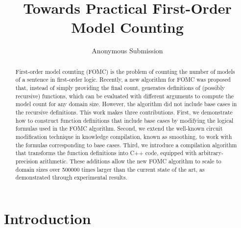 \documentclass[letterpaper]{article} %
\title{Towards Practical First-Order Model Counting}
\author{Anonymous Submission}
\theoremstyle{remark}
\theoremstyle{definition}
\begin{document}
\maketitle

\begin{abstract}
  First-order model counting (FOMC) is the problem of counting the number of
  models of a sentence in first-order logic. Recently, a new algorithm for FOMC
  was proposed that, instead of simply providing the final count, generates
  definitions of (possibly recursive) functions, which can be evaluated with
  different arguments to compute the model count for any domain size. However,
  the algorithm did not include base cases in the recursive definitions. This
  work makes three contributions. First, we demonstrate how to construct
  function definitions that include base cases by modifying the logical formulas
  used in the FOMC algorithm. Second, we extend the well-known circuit
  modification technique in knowledge compilation, known as smoothing, to work
  with the formulas corresponding to base cases. Third, we introduce a
  compilation algorithm that transforms the function definitions into C++ code,
  equipped with arbitrary-precision arithmetic. These additions allow the new
  FOMC algorithm to scale to domain sizes over \num{500000} times larger than
  the current state of the art, as demonstrated through experimental results.
\end{abstract}




\section{Introduction}

\end{document}
